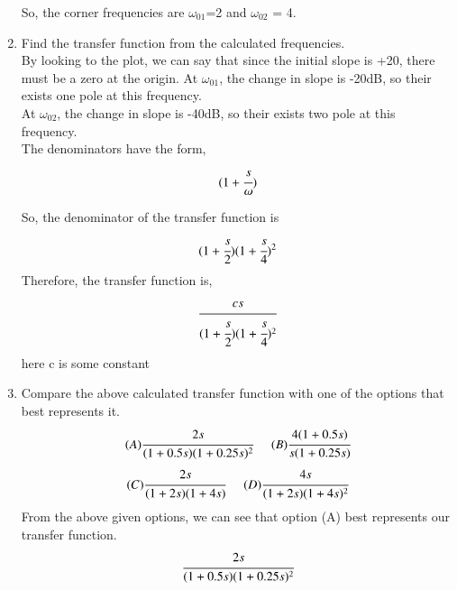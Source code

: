 \begin{enumerate}[label=\thesection.\arabic*.,ref=\thesection.\theenumi]
So, the corner frequencies are $\omega_{01}$=2 and $\omega_{02}$ = 4.\\


\item Find the transfer function from the calculated frequencies.
\\
\solution
By looking to the plot, we can say that since the initial slope is +20, there must be a zero at the origin.
At $\omega_{01}$, the change in slope is -20dB, so their exists one pole at this frequency.\\
At $\omega_{02}$, the change in slope is -40dB, so their exists two pole at this frequency.\\
The denominators have the form,
\begin{align*}
    (1 + \cfrac{s}{\omega})
\end{align*}

So, the denominator of the transfer function is 
\begin{align*}
    (1 + \cfrac{s}{2})(1 + \cfrac{s}{4})^2
\end{align*}
Therefore, the transfer function is,
\begin{align*}
    \cfrac{cs}{(1 + \cfrac{s}{2})(1 + \cfrac{s}{4})^2} 
\end{align*}
here c is some constant\\


\item Compare the above calculated transfer function with one of the options that best represents it.
\begin{multline*}
    (A) \cfrac{2s}{(1+0.5s)(1+0.25s)^2}\hspace{0.5cm}
    (B) \cfrac{4(1+0.5s)}{s(1+0.25s)}
\end{multline*}
\begin{multline*}
    (C) \cfrac{2s}{(1+2s)(1+4s)}\hspace{0.5cm}
    (D) \cfrac{4s}{(1+2s)(1+4s)^2}
\end{multline*}
\solution
From the above given options, we can see that option (A) best represents our transfer function.
\begin{align*}
     \cfrac{2s}{(1+0.5s)(1+0.25s)^2}
\end{align*}



\end{enumerate}
